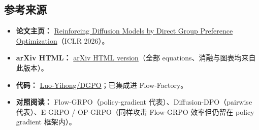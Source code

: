 \subsection{参考来源}

\begin{itemize}[leftmargin=1.5em]
  \item \textbf{论文主页：} \href{https://arxiv.org/abs/2510.08425}{Reinforcing Diffusion Models by Direct Group Preference Optimization}（ICLR 2026）。
  \item \textbf{arXiv HTML：} \href{https://arxiv.org/html/2510.08425v1}{arXiv HTML version}（全部 equations、消融与图表均来自此版本）。
  \item \textbf{代码：} \href{https://github.com/Luo-Yihong/DGPO}{Luo-Yihong/DGPO}；已集成进 Flow-Factory。
  \item \textbf{对照阅读：} Flow-GRPO（policy-gradient 代表）、Diffusion-DPO（pairwise 代表）、E-GRPO / OP-GRPO（同样攻击 Flow-GRPO 效率但仍留在 policy gradient 框架内）。
\end{itemize}
